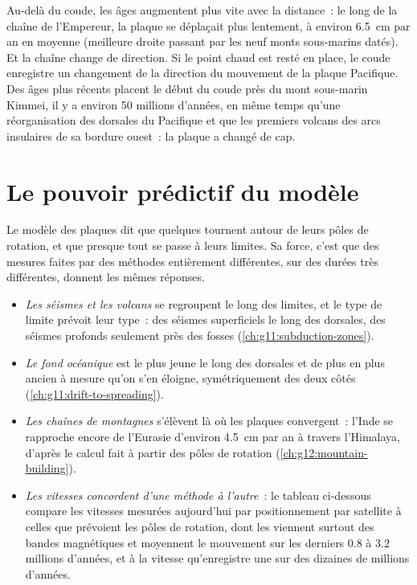 Au-delà du coude, les âges augmentent plus vite avec la distance~: le long
de la chaîne de l'Empereur, la plaque se déplaçait plus lentement, à environ
\qty{6.5}{cm} par an en moyenne (meilleure droite passant par les neuf
monts sous-marins datés). Et la chaîne change de direction. Si le point
chaud est resté en place, le coude enregistre un changement de la direction
du mouvement de la plaque Pacifique. Des âges plus récents placent le début
du coude près du mont sous-marin Kimmei, il y a environ 50 millions
d'années, en même temps qu'une réorganisation des dorsales du Pacifique et
que les premiers volcans des arcs insulaires de sa bordure ouest~: la
plaque a changé de cap.

\section{Le pouvoir prédictif du modèle}\label{sec:g11:plate-motions:predictive}

Le modèle des plaques dit que quelques  tournent autour de
leurs pôles de rotation, et que presque tout se passe à leurs limites. Sa
force, c'est que des mesures faites par des méthodes entièrement
différentes, sur des durées très différentes, donnent les mêmes réponses.

\begin{itemize}
  \item \emph{Les séismes et les volcans} se regroupent le long des
        limites, et le type de limite prévoit leur type~: des séismes
        superficiels le long des dorsales, des séismes profonds seulement
        près des fosses (\cref{ch:g11:subduction-zones}).
  \item \emph{Le fond océanique} est le plus jeune le long des dorsales et
        de plus en plus ancien à mesure qu'on s'en éloigne, symétriquement
        des deux côtés (\cref{ch:g11:drift-to-spreading}).
  \item \emph{Les chaînes de montagnes} s'élèvent là où les plaques
        convergent~: l'Inde se rapproche encore de l'Eurasie d'environ
        \qty{4.5}{cm} par an à travers l'Himalaya, d'après le calcul
        fait à partir des pôles de rotation (\cref{ch:g12:mountain-building}).
  \item \emph{Les vitesses concordent d'une méthode à l'autre}~: le tableau
        ci-dessous compare les vitesses mesurées aujourd'hui par
        positionnement par satellite à celles que prévoient les pôles de
        rotation, dont les  viennent surtout des bandes
        magnétiques et moyennent le mouvement sur les derniers
        \num{0.8} à \num{3.2} millions d'années, et à la vitesse
        qu'enregistre une  sur des dizaines de millions
        d'années.
\end{itemize}

